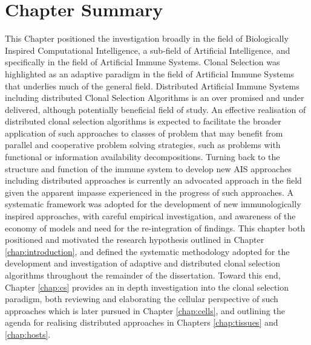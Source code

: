 \section{Chapter Summary}
\label{sec:background:summary}
This Chapter positioned the investigation broadly in the field of Biologically Inspired Computational Intelligence, a sub-field of Artificial Intelligence, and specifically in the field of Artificial Immune Systems. 
Clonal Selection was highlighted as an adaptive paradigm in the field of Artificial Immune Systems that underlies much of the general field.
Distributed Artificial Immune Systems including distributed Clonal Selection Algorithms is an over promised and under delivered, although potentially beneficial field of study. An effective realisation of distributed clonal selection algorithms is expected to facilitate the broader application of such approaches to classes of problem that may benefit from parallel and cooperative problem solving strategies, such as problems with functional or information availability decompositions.
Turning back to the structure and function of the immune system to develop new AIS approaches including distributed approaches is currently an advocated approach in the field given the apparent impasse experienced in the progress of such approaches. 
A systematic framework was adopted for the development of new immunologically inspired approaches, with careful empirical investigation, and awareness of the economy of models and need for the re-integration of findings.
This chapter both positioned and motivated the research hypothesis outlined in Chapter \ref{chap:introduction}, and defined the systematic methodology adopted for the development and investigation of adaptive and distributed clonal selection algorithms throughout the remainder of the dissertation. Toward this end, Chapter \ref{chap:cs} provides an in depth investigation into the clonal selection paradigm, both reviewing and elaborating the cellular perspective of such approaches which is later pursued in Chapter \ref{chap:cells}, and outlining the agenda for realising distributed approaches in Chapters \ref{chap:tissues} and \ref{chap:hosts}.

